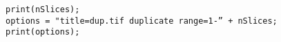 \begin{lstlisting}
print(nSlices);
options = "title=dup.tif duplicate range=1-” + nSlices;
print(options);

\end{lstlisting}